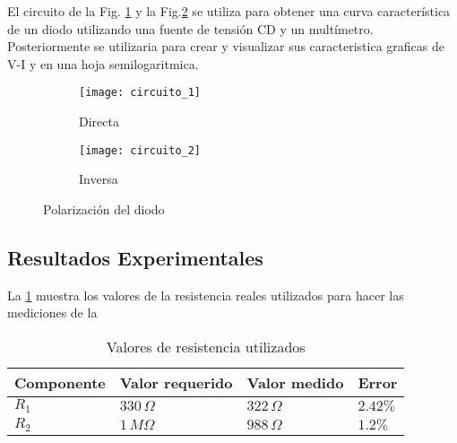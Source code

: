 \documentclass[journal]{IEEEtran}
\begin{document}
El circuito de la Fig. \ref{fig:directa} y la Fig.\ref{fig:reversa} se utiliza para obtener una curva característica de un diodo utilizando una fuente de tensión CD y un multímetro. Posteriormente se utilizaria para crear y visualizar sus caracteristica graficas de V-I y en una hoja semilogaritmica.

 
\begin{figure}[H]
\centering
\begin{subfigure}[c]{0.4\textwidth}
	\centering
	\texttt{[image: circuito\_1]}
	\caption{Directa}
	\label{fig:directa}	
\end{subfigure}
\hfill
\begin{subfigure}[c]{0.4\textwidth}
	\centering
	\texttt{[image: circuito\_2]}
	\caption{Inversa}
	\label{fig:reversa}	
\end{subfigure}
\caption{Polarización del diodo}
\label{fig:poldiodo}
\end{figure}

\subsection{Resultados Experimentales}

La \ref{tabla1} muestra los valores de la resistencia reales utilizados para hacer las mediciones de la 

	\begin{table}[H]
        \centering
        \caption{Valores de resistencia utilizados}
        \begin{tabular}{|>{\centering\arraybackslash}m{1.5cm}|>{\centering\arraybackslash}m{1.5cm}|>{\centering\arraybackslash}m{1.5cm}|>{\centering\arraybackslash}m{1.5cm}|}
             \hline
             Componente & Valor requerido & Valor medido & Error \\ 
             \hline
             $R_1$ & $330\,\Omega$ & $322\,\Omega$ & $2.42\%$ \\ 
             \hline
             $R_2$ & $1\,M\Omega$ & $988\,\Omega$ & $1.2\%$ \\
             \hline
            \end{tabular}
    	\label{tabla1}   
	\end{table}
	
\end{document}
